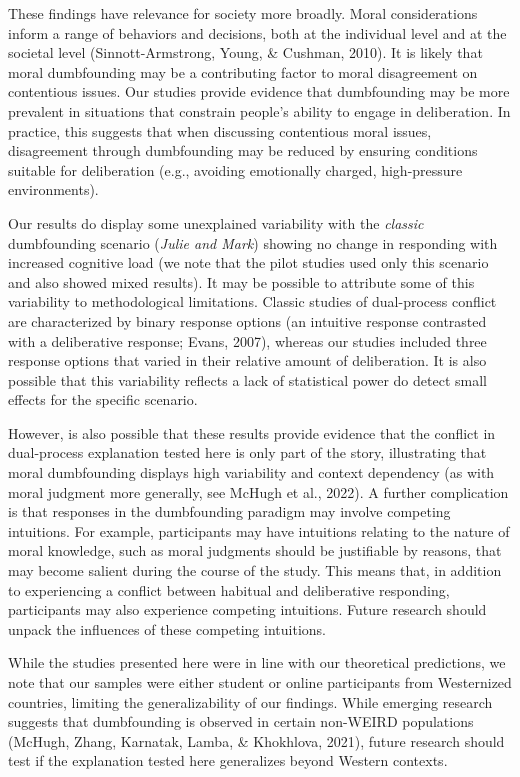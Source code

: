 \documentclass[
  american,
  man,floatsintext]{apa7}
\begin{document}
These findings have relevance for society more broadly. Moral considerations inform a range of behaviors and decisions, both at the individual level and at the societal level (Sinnott-Armstrong, Young, \& Cushman, 2010). It is likely that moral dumbfounding may be a contributing factor to moral disagreement on contentious issues. Our studies provide evidence that dumbfounding may be more prevalent in situations that constrain people's ability to engage in deliberation. In practice, this suggests that when discussing contentious moral issues, disagreement through dumbfounding may be reduced by ensuring conditions suitable for deliberation (e.g., avoiding emotionally charged, high-pressure environments).

Our results do display some unexplained variability with the \emph{classic} dumbfounding scenario (\emph{Julie and Mark}) showing no change in responding with increased cognitive load (we note that the pilot studies used only this scenario and also showed mixed results). It may be possible to attribute some of this variability to methodological limitations. Classic studies of dual-process conflict are characterized by binary response options (an intuitive response contrasted with a deliberative response; Evans, 2007), whereas our studies included three response options that varied in their relative amount of deliberation. It is also possible that this variability reflects a lack of statistical power do detect small effects for the specific scenario.

However, is also possible that these results provide evidence that the conflict in dual-process explanation tested here is only part of the story, illustrating that moral dumbfounding displays high variability and context dependency (as with moral judgment more generally, see McHugh et al., 2022). A further complication is that responses in the dumbfounding paradigm may involve competing intuitions. For example, participants may have intuitions relating to the nature of moral knowledge, such as moral judgments should be justifiable by reasons, that may become salient during the course of the study. This means that, in addition to experiencing a conflict between habitual and deliberative responding, participants may also experience competing intuitions. Future research should unpack the influences of these competing intuitions.

While the studies presented here were in line with our theoretical predictions, we note that our samples were either student or online participants from Westernized countries, limiting the generalizability of our findings. While emerging research suggests that dumbfounding is observed in certain non-WEIRD populations (McHugh, Zhang, Karnatak, Lamba, \& Khokhlova, 2021), future research should test if the explanation tested here generalizes beyond Western contexts.
\end{document}
